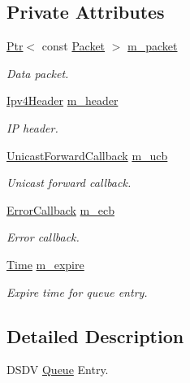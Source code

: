 \subsection*{Private Attributes}
\begin{DoxyCompactItemize}
\item 
\hyperlink{classns3_1_1Ptr}{Ptr}$<$ const \hyperlink{classns3_1_1Packet}{Packet} $>$ \hyperlink{classns3_1_1dsdv_1_1QueueEntry_a6402b0428fa03fc63051c78363b53885}{m\+\_\+packet}
\begin{DoxyCompactList}\small\item\em Data packet. \end{DoxyCompactList}\item 
\hyperlink{classns3_1_1Ipv4Header}{Ipv4\+Header} \hyperlink{classns3_1_1dsdv_1_1QueueEntry_aba9e576a27ce759f07f32f014c7dd34a}{m\+\_\+header}
\begin{DoxyCompactList}\small\item\em IP header. \end{DoxyCompactList}\item 
\hyperlink{classns3_1_1dsdv_1_1QueueEntry_a5c41d545aa1e05b73ee36b718f331522}{Unicast\+Forward\+Callback} \hyperlink{classns3_1_1dsdv_1_1QueueEntry_a7147d9625ce302ebba00e81554275033}{m\+\_\+ucb}
\begin{DoxyCompactList}\small\item\em Unicast forward callback. \end{DoxyCompactList}\item 
\hyperlink{classns3_1_1dsdv_1_1QueueEntry_ad6d86a09705f644d2535f606e70c1c29}{Error\+Callback} \hyperlink{classns3_1_1dsdv_1_1QueueEntry_ab43b6de08b3882a6f183692bdda4e4a9}{m\+\_\+ecb}
\begin{DoxyCompactList}\small\item\em Error callback. \end{DoxyCompactList}\item 
\hyperlink{classns3_1_1Time}{Time} \hyperlink{classns3_1_1dsdv_1_1QueueEntry_acf301260f61bf4165e298e2d87f407e9}{m\+\_\+expire}
\begin{DoxyCompactList}\small\item\em Expire time for queue entry. \end{DoxyCompactList}\end{DoxyCompactItemize}


\subsection{Detailed Description}
D\+S\+DV \hyperlink{classns3_1_1Queue}{Queue} Entry. 

